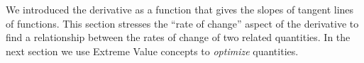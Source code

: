 
We introduced the derivative as a function that gives the slopes of tangent lines of functions. This 
section stresses the ``rate of change'' aspect of the derivative to find a relationship between the rates of change of two related quantities. 
In the next section we use Extreme Value concepts to \textit{optimize} quantities. 



